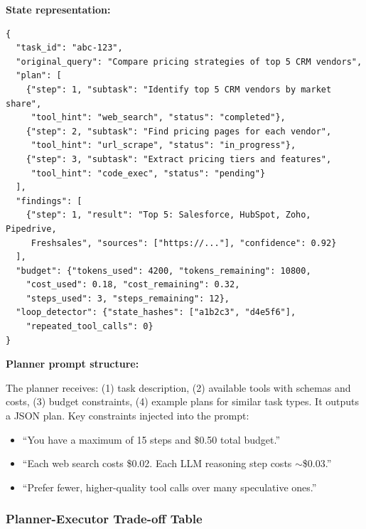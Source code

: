 \textbf{State representation:}

\begin{verbatim}
{
  "task_id": "abc-123",
  "original_query": "Compare pricing strategies of top 5 CRM vendors",
  "plan": [
    {"step": 1, "subtask": "Identify top 5 CRM vendors by market share",
     "tool_hint": "web_search", "status": "completed"},
    {"step": 2, "subtask": "Find pricing pages for each vendor",
     "tool_hint": "url_scrape", "status": "in_progress"},
    {"step": 3, "subtask": "Extract pricing tiers and features",
     "tool_hint": "code_exec", "status": "pending"}
  ],
  "findings": [
    {"step": 1, "result": "Top 5: Salesforce, HubSpot, Zoho, Pipedrive,
     Freshsales", "sources": ["https://..."], "confidence": 0.92}
  ],
  "budget": {"tokens_used": 4200, "tokens_remaining": 10800,
    "cost_used": 0.18, "cost_remaining": 0.32,
    "steps_used": 3, "steps_remaining": 12},
  "loop_detector": {"state_hashes": ["a1b2c3", "d4e5f6"],
    "repeated_tool_calls": 0}
}
\end{verbatim}

\textbf{Planner prompt structure:}

The planner receives: (1) task description, (2) available tools with schemas and costs, (3) budget constraints, (4) example plans for similar task types. It outputs a JSON plan. Key constraints injected into the prompt:
\begin{itemize}
  \item ``You have a maximum of 15 steps and \$0.50 total budget.''
  \item ``Each web search costs \$0.02. Each LLM reasoning step costs $\sim$\$0.03.''
  \item ``Prefer fewer, higher-quality tool calls over many speculative ones.''
\end{itemize}

\subsubsection*{Planner-Executor Trade-off Table}

